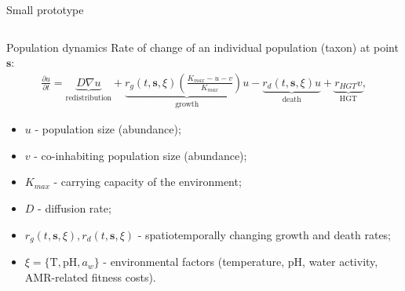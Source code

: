 \documentclass[mathserif,11pt]{beamer}
\begin{document}
\begin{frame}{Small prototype}
\begin{columns}
\begin{column}{0.4\textwidth}
		\end{column}
	\end{columns}
\end{frame}
\begin{frame}{Population dynamics}
		 Rate of change of an individual population (taxon) at point $\mathbf{s}$:
	\begin{align*}\label{eq:simple_diff}
\frac{\partial u}{ \partial t} = \underbrace{ D \nabla u}_{\text{redistribution}} +
 \underbrace{r_{g}(t, \mathbf{s}, \xi) \left(\frac{K_{max} - u - v}{K_{max}} \right) u}_{\text{growth}} - \underbrace{r_{d}(t, \mathbf{s}, \xi) u}_{\text{death}} + \underbrace{r_{HGT} v}_{\text{HGT}},	
\end{align*}
\begin{itemize}
	\item $u$ - population size (abundance);
	\item $v$ - co-inhabiting population size (abundance);
	\item $K_{max}$ - carrying capacity of the environment;
	\item $D$ - diffusion rate;
	\item $r_{g}(t, \mathbf{s}, \xi), r_{d}(t, \mathbf{s}, \xi)$ - spatiotemporally changing growth and death rates;
	\item $\xi = \lbrace \mathrm{T}, \mathrm{pH}, a_w \rbrace$ - environmental factors (temperature, pH, water activity, AMR-related fitness costs).
\end{itemize}
\end{frame}
\end{document}
